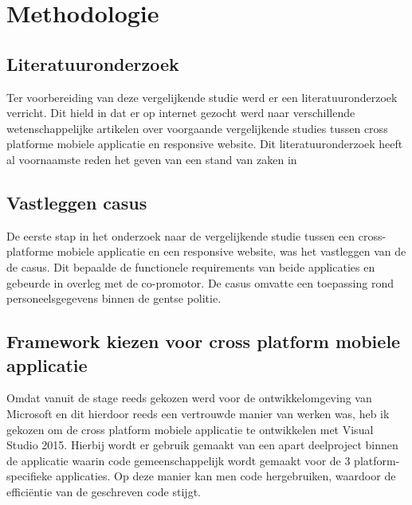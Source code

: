 
\chapter{Methodologie}
\label{ch:methodologie}


\section{Literatuuronderzoek}
Ter voorbereiding van deze vergelijkende studie werd er een literatuuronderzoek verricht.
Dit hield in dat er op internet gezocht werd naar verschillende wetenschappelijke artikelen over voorgaande vergelijkende studies
tussen cross platforme mobiele applicatie en responsive website. Dit literatuuronderzoek heeft al voornaamste reden het geven van
een stand van zaken in

\section{Vastleggen casus}
De eerste stap in het onderzoek naar de vergelijkende studie tussen een cross-platforme mobiele applicatie en een
responsive website, was het vastleggen van de de casus. Dit bepaalde de functionele requirements van beide applicaties en
gebeurde in overleg met de co-promotor. De casus omvatte een toepassing rond personeelsgegevens binnen de gentse politie.

\section{Framework kiezen voor cross platform mobiele applicatie}
Omdat vanuit de stage reeds gekozen werd voor de ontwikkelomgeving van Microsoft en dit hierdoor reeds een vertrouwde
manier van werken was, heb ik gekozen om de cross platform mobiele applicatie te ontwikkelen met Visual Studio 2015.
Hierbij wordt er gebruik gemaakt van een apart deelproject binnen de applicatie waarin code gemeenschappelijk wordt gemaakt voor
de 3 platform-specifieke applicaties. Op deze manier kan men code hergebruiken, waardoor de efficiëntie van de geschreven code stijgt.

